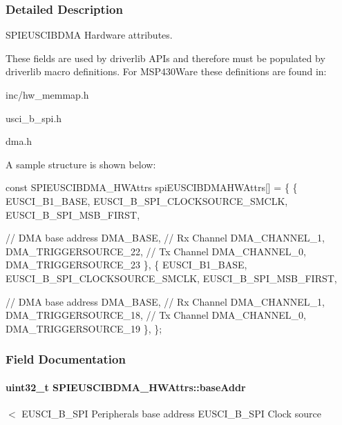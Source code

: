 \subsubsection{Detailed Description}
S\+P\+I\+E\+U\+S\+C\+I\+B\+D\+M\+A Hardware attributes. 

These fields are used by driverlib A\+P\+Is and therefore must be populated by driverlib macro definitions. For M\+S\+P430\+Ware these definitions are found in\+:
\begin{DoxyItemize}
\item inc/hw\+\_\+memmap.\+h
\item usci\+\_\+b\+\_\+spi.\+h
\item dma.\+h
\end{DoxyItemize}

A sample structure is shown below\+: 
\begin{DoxyCode}
\textcolor{keyword}{const} SPIEUSCIBDMA_HWAttrs spiEUSCIBDMAHWAttrs[] = \{
    \{
        EUSCI\_B1\_BASE,
        EUSCI\_B\_SPI\_CLOCKSOURCE\_SMCLK,
        EUSCI\_B\_SPI\_MSB\_FIRST,

        \textcolor{comment}{// DMA base address}
        DMA\_BASE,
        \textcolor{comment}{// Rx Channel}
        DMA\_CHANNEL\_1,
        DMA\_TRIGGERSOURCE\_22,
        \textcolor{comment}{// Tx Channel}
        DMA\_CHANNEL\_0,
        DMA\_TRIGGERSOURCE\_23
    \},
    \{
        EUSCI\_B1\_BASE,
        EUSCI\_B\_SPI\_CLOCKSOURCE\_SMCLK,
        EUSCI\_B\_SPI\_MSB\_FIRST,

        \textcolor{comment}{// DMA base address}
        DMA\_BASE,
        \textcolor{comment}{// Rx Channel}
        DMA\_CHANNEL\_1,
        DMA\_TRIGGERSOURCE\_18,
        \textcolor{comment}{// Tx Channel}
        DMA\_CHANNEL\_0,
        DMA\_TRIGGERSOURCE\_19
    \},
\};
\end{DoxyCode}
 

\subsubsection{Field Documentation}
\paragraph[{base\+Addr}]{\setlength{\rightskip}{0pt plus 5cm}uint32\+\_\+t S\+P\+I\+E\+U\+S\+C\+I\+B\+D\+M\+A\+\_\+\+H\+W\+Attrs\+::base\+Addr}\label{struct_s_p_i_e_u_s_c_i_b_d_m_a___h_w_attrs_abcb08979f4f6514395d165403a23d100}
$<$ E\+U\+S\+C\+I\+\_\+\+B\+\_\+\+S\+P\+I Peripheral\textquotesingle{}s base address E\+U\+S\+C\+I\+\_\+\+B\+\_\+\+S\+P\+I Clock source 
